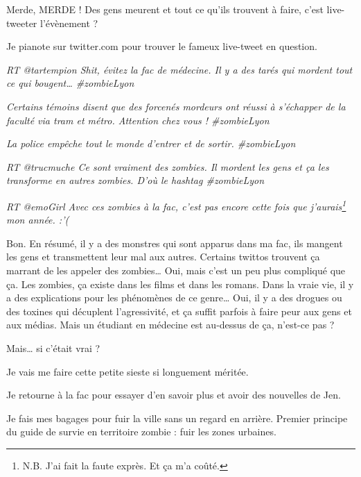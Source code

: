 Merde, MERDE ! Des gens meurent et tout ce qu'ils trouvent à faire, c'est live-tweeter l'évènement ?

Je pianote sur twitter.com pour trouver le fameux live-tweet en question.

\begin{center}
\textit{RT @tartempion Shit, évitez la fac de médecine. Il y a des tarés qui mordent tout ce qui bougent… \#{}zombieLyon}
\end{center}

\begin{center}
\textit{Certains témoins disent que des forcenés mordeurs ont réussi à s'échapper de la faculté via tram et métro. Attention chez vous ! \#{}zombieLyon}
\end{center}

\begin{center}
\textit{La police empêche tout le monde d'entrer et de sortir. \#{}zombieLyon}
\end{center}

\begin{center}
\textit{RT @trucmuche Ce sont vraiment des zombies. Il mordent les gens et ça les transforme en autres zombies. D'où le hashtag \#{}zombieLyon}
\end{center}

\begin{center}
\textit{RT @emoGirl Avec ces zombies à la fac, c'est pas encore cette fois que j'aurais\footnote{N.B. J'ai fait la faute exprès. Et ça m'a coûté.} mon année. :'(}
\end{center}

Bon. En résumé, il y a des monstres qui sont apparus dans ma fac, ils mangent les gens et transmettent leur mal aux autres. Certains twittos trouvent ça marrant de les appeler des zombies… Oui, mais c'est un peu plus compliqué que ça. Les zombies, ça existe dans les films et dans les romans. Dans la vraie vie, il y a des explications pour les phénomènes de ce genre… Oui, il y a des drogues ou des toxines qui décuplent l'agressivité, et ça suffit parfois à faire peur aux gens et aux médias. Mais un étudiant en médecine est au-dessus de ça, n'est-ce pas ?

Mais… si c'était vrai ?

\item Je vais me faire cette petite sieste si longuement méritée.
\item Je retourne à la fac pour essayer d'en savoir plus et avoir des nouvelles de Jen. 
\item Je fais mes bagages pour fuir la ville sans un regard en arrière. Premier principe du guide de survie en territoire zombie : fuir les zones urbaines. 
\enw

